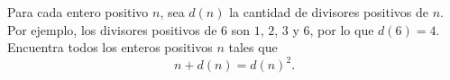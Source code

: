 Para cada entero positivo $n$, sea $d(n)$ la cantidad de divisores positivos de $n$. Por ejemplo, los divisores positivos de $6$ son $1$, $2$, $3$ y $6$, por lo que $d(6) = 4$.
Encuentra todos los enteros positivos $n$ tales que
\[n + d(n) = d(n)^2.\]